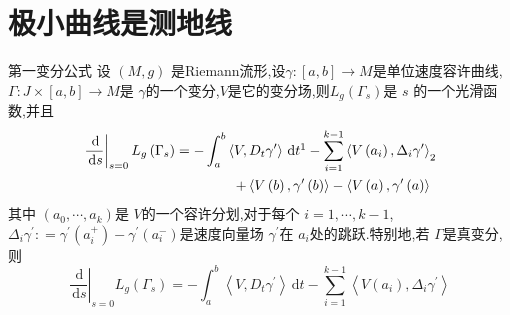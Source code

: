 \documentclass[../../几何与拓扑.tex]{subfiles}
\begin{document}
\section{极小曲线是测地线}

\begin{theorem}{第一变分公式}
    设 \(  \left( M,g \right)   \) 是Riemann流形,设\(   \gamma :\left[ a,b \right]\to M   \)是单位速度容许曲线, \(   \Gamma : J\times \left[ a,b \right]\to M   \)是 \(   \gamma   \)的一个变分,\(  V  \)是它的变分场,则\(  L_{g}\left(  \Gamma _{s} \right)   \)是 \(  s  \) 的一个光滑函数,并且 \begin{equation}
           \begin{aligned}
            \left. \frac{\,\mathrm{d}  }{\,\mathrm{d} s }  \right|_{s= 0} L_{g}\left(  \Gamma _{s} \right)=  - \int_{a}^{b}\left<V,D_{t} \gamma ^{\prime}  \right>\,\mathrm{d} t \footnotemark - \sum _{i= 1}^{k-1}\left<V\left( a_{i} \right),  \Delta _{i} \gamma ^{\prime}   \right> \\ 
            + \left<V\left( b \right), \gamma ^{\prime} \left( b \right)   \right>-\left<V\left( a \right), \gamma ^{\prime} \left( a \right)   \right>   
           \end{aligned} \footnotemark 
    \end{equation}
    其中 \(  \left(  a_0,\cdots,a_{k}    \right)   \)是 \(  V  \)的一个容许分划,对于每个 \(  i=  1,\cdots,k -1  \), \(   \Delta _{i} \gamma ^{\prime} : =   \gamma ^{\prime} \left( a_{i}^{+ } \right)- \gamma ^{\prime} \left( a_{i}^{-} \right)    \)是速度向量场 \(   \gamma ^{\prime}   \)在 \(  a_{i}  \)处的跳跃.特别地,若 \(   \Gamma   \)是真变分,则
    \begin{equation}\label{eq-1}
        \left. \frac{\,\mathrm{d}  }{\,\mathrm{d} s }  \right|_{s= 0} L_{g}\left(  \Gamma _{s} \right)= - \int_{a}^{b}\left<V,D_{t} \gamma ^{\prime}  \right>\,\mathrm{d} t-\sum _{i= 1}^{k-1}\left<V\left( a_{i} \right), \Delta _{i} \gamma ^{\prime}   \right> 
    \end{equation}      
\end{theorem}
\end{document}
